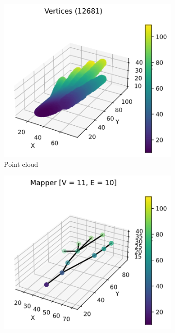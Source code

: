 \documentclass{article}
\begin{document}
\begin{figure}[H]
    \centering
    \begin{subfigure}[c]{0.3\columnwidth}
        \centering
        \includegraphics[width=\textwidth]{hand-point-cloud}
        \caption{Point cloud}
        \label{fig:hand-points}
    \end{subfigure}
    \begin{subfigure}[c]{0.3\columnwidth}
        \centering
        \includegraphics[width=\textwidth]{hand-graph-3d}

\end{subfigure}
\end{figure}
\end{document}
